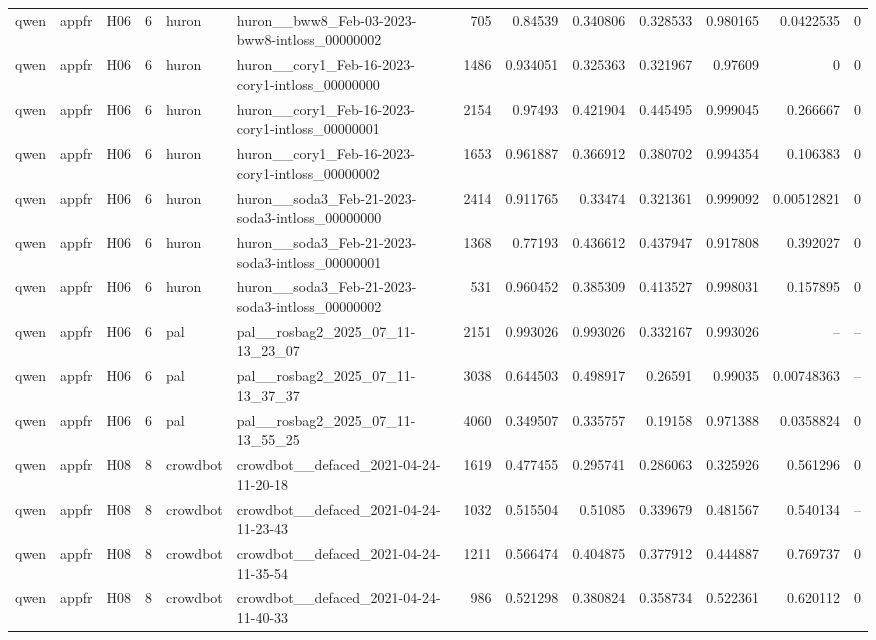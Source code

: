 \begin{longtable}{lllrllrrrrrrr}
qwen & appfr & H06 & 6 & huron & huron\_\_bww8\_Feb-03-2023-bww8-intloss\_00000002 & 705 & 0.84539 & 0.340806 & 0.328533 & 0.980165 & 0.0422535 & 0 \\
qwen & appfr & H06 & 6 & huron & huron\_\_cory1\_Feb-16-2023-cory1-intloss\_00000000 & 1486 & 0.934051 & 0.325363 & 0.321967 & 0.97609 & 0 & 0 \\
qwen & appfr & H06 & 6 & huron & huron\_\_cory1\_Feb-16-2023-cory1-intloss\_00000001 & 2154 & 0.97493 & 0.421904 & 0.445495 & 0.999045 & 0.266667 & 0 \\
qwen & appfr & H06 & 6 & huron & huron\_\_cory1\_Feb-16-2023-cory1-intloss\_00000002 & 1653 & 0.961887 & 0.366912 & 0.380702 & 0.994354 & 0.106383 & 0 \\
qwen & appfr & H06 & 6 & huron & huron\_\_soda3\_Feb-21-2023-soda3-intloss\_00000000 & 2414 & 0.911765 & 0.33474 & 0.321361 & 0.999092 & 0.00512821 & 0 \\
qwen & appfr & H06 & 6 & huron & huron\_\_soda3\_Feb-21-2023-soda3-intloss\_00000001 & 1368 & 0.77193 & 0.436612 & 0.437947 & 0.917808 & 0.392027 & 0 \\
qwen & appfr & H06 & 6 & huron & huron\_\_soda3\_Feb-21-2023-soda3-intloss\_00000002 & 531 & 0.960452 & 0.385309 & 0.413527 & 0.998031 & 0.157895 & 0 \\
qwen & appfr & H06 & 6 & pal & pal\_\_rosbag2\_2025\_07\_11-13\_23\_07 & 2151 & 0.993026 & 0.993026 & 0.332167 & 0.993026 & -- & -- \\
qwen & appfr & H06 & 6 & pal & pal\_\_rosbag2\_2025\_07\_11-13\_37\_37 & 3038 & 0.644503 & 0.498917 & 0.26591 & 0.99035 & 0.00748363 & -- \\
qwen & appfr & H06 & 6 & pal & pal\_\_rosbag2\_2025\_07\_11-13\_55\_25 & 4060 & 0.349507 & 0.335757 & 0.19158 & 0.971388 & 0.0358824 & 0 \\
qwen & appfr & H08 & 8 & crowdbot & crowdbot\_\_defaced\_2021-04-24-11-20-18 & 1619 & 0.477455 & 0.295741 & 0.286063 & 0.325926 & 0.561296 & 0 \\
qwen & appfr & H08 & 8 & crowdbot & crowdbot\_\_defaced\_2021-04-24-11-23-43 & 1032 & 0.515504 & 0.51085 & 0.339679 & 0.481567 & 0.540134 & -- \\
qwen & appfr & H08 & 8 & crowdbot & crowdbot\_\_defaced\_2021-04-24-11-35-54 & 1211 & 0.566474 & 0.404875 & 0.377912 & 0.444887 & 0.769737 & 0 \\
qwen & appfr & H08 & 8 & crowdbot & crowdbot\_\_defaced\_2021-04-24-11-40-33 & 986 & 0.521298 & 0.380824 & 0.358734 & 0.522361 & 0.620112 & 0 \\

\end{longtable}
